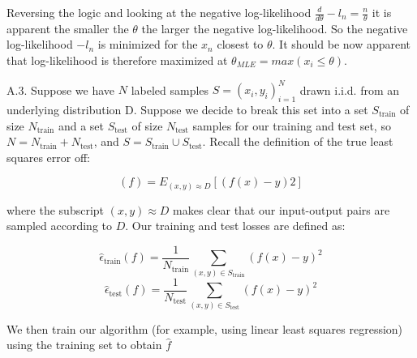 \documentclass{article}
\newcommand{\1}{\mathbf{1}}
\begin{document}
Reversing the logic and looking at the negative log-likelihood $\frac{d}{d\theta}-l_n  = \frac{n}{\theta}$ it is apparent the smaller the $\theta$ the larger the negative log-likelihood. So the negative log-likelihood $-l_n$ is minimized for the $x_n$ closest to $\theta$. It should be now apparent that log-likelihood is therefore maximized at $\theta_{MLE}=max(x_i \leq \theta)$. 


\newpage
A.3.  Suppose we have $N$ labeled samples $S={(x_i,y_i)}^N_{i=1}$ drawn i.i.d. from an underlying distribution D. Suppose we decide to break this set into a set $S_\text{train}$ of size $N_\text{train}$ and a set $S_\text{test}$ of size $N_\text{test}$ samples for our training and test set, so $N = N_{\text{train}} + N_{\text{test}}$, and $S = S_{\text{train}} \cup S_{\text{test}}$.  Recall the definition of the true least squares error off:

$$(f) =E_{(x,y)\approx D}[(f(x)-y)2]$$

where the subscript $(x,y)\approx D$ makes clear that our input-output pairs are sampled according to $D$. Our training and test losses are defined as: 

$$\widehat\epsilon_{\text{train}}(f) = \frac{1}{N_\text{train}}\sum_{(x,y)\in S_\text{train}}(f(x)-y)^2$$
$$\widehat\epsilon_{\text{test}}(f) = \frac{1}{N_\text{test}}\sum_{(x,y)\in S_\text{test}}(f(x)-y)^2$$

We then train our algorithm (for example, using linear least squares regression) using the training set to obtain $\hat f$
\end{document}
